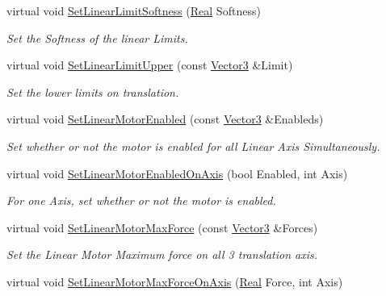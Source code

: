 \begin{DoxyCompactItemize}
virtual void \hyperlink{classphys_1_1Generic6DofConstraint_a68543c0db9abd36d0dc2126840c77a74}{SetLinearLimitSoftness} (\hyperlink{namespacephys_af7eb897198d265b8e868f45240230d5f}{Real} Softness)
\begin{DoxyCompactList}\small\item\em Set the Softness of the linear Limits. \item\end{DoxyCompactList}\item 
virtual void \hyperlink{classphys_1_1Generic6DofConstraint_a55f3d23d2892d09557dfbabf06253745}{SetLinearLimitUpper} (const \hyperlink{classphys_1_1Vector3}{Vector3} \&Limit)
\begin{DoxyCompactList}\small\item\em Set the lower limits on translation. \item\end{DoxyCompactList}\item 
virtual void \hyperlink{classphys_1_1Generic6DofConstraint_a36f596d27cd10f350dd560d908246629}{SetLinearMotorEnabled} (const \hyperlink{classphys_1_1Vector3}{Vector3} \&Enableds)
\begin{DoxyCompactList}\small\item\em Set whether or not the motor is enabled for all Linear Axis Simultaneously. \item\end{DoxyCompactList}\item 
virtual void \hyperlink{classphys_1_1Generic6DofConstraint_a166625de5d0556fe0643a265ea8a02ef}{SetLinearMotorEnabledOnAxis} (bool Enabled, int Axis)
\begin{DoxyCompactList}\small\item\em For one Axis, set whether or not the motor is enabled. \item\end{DoxyCompactList}\item 
virtual void \hyperlink{classphys_1_1Generic6DofConstraint_aa9f021e716bc9f72d7c7d414427dea7d}{SetLinearMotorMaxForce} (const \hyperlink{classphys_1_1Vector3}{Vector3} \&Forces)
\begin{DoxyCompactList}\small\item\em Set the Linear Motor Maximum force on all 3 translation axis. \item\end{DoxyCompactList}\item 
virtual void \hyperlink{classphys_1_1Generic6DofConstraint_ae54e4fa97b637636ed7bcace15ce8693}{SetLinearMotorMaxForceOnAxis} (\hyperlink{namespacephys_af7eb897198d265b8e868f45240230d5f}{Real} Force, int Axis)

\end{DoxyCompactItemize}
